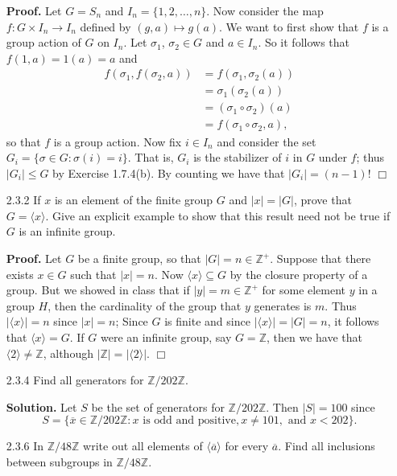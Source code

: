 \documentclass[9pt]{article}
\newcommand{\qed}{\hfill \ensuremath{\Box}}
\newcommand{\cyc}[1]{\langle #1 \rangle}
\newcommand{\Z}{\mathbb{Z}}
\begin{document}
\begin{enumerate}
      \textbf{Proof.} Let $G = S_n$ and $I_n = \{1, 2, \ldots, n\}$. Now
      consider the map $f: G \times I_n \rightarrow I_n$ defined by 
      $(g, a) \mapsto g(a)$. We want to first show that $f$ is a group action of
      $G$ on $I_n$. Let $\sigma_1$, $\sigma_2 \in G$ and $a \in I_n$. So it
      follows that $f(1, a) = 1(a) = a$ and
      \begin{align*}
         f(\sigma_1, f(\sigma_2, a)) &= f(\sigma_1, \sigma_2(a)) \\
            &= \sigma_1(\sigma_2(a)) \\
            &= (\sigma_1 \circ \sigma_2)(a) \\
            &= f(\sigma_1 \circ \sigma_2, a),
      \end{align*}
      so that $f$ is a group action. Now fix $i \in I_n$ and consider the set
      $G_i = \{\sigma \in G : \sigma(i) = i\}$. That is, $G_i$ is the stabilizer
      of $i$ in $G$ under $f$; thus $|G_i| \le G$ by Exercise 1.7.4(b). By
      counting we have that $|G_i| = (n - 1)!$ \qed
   \item[2.3.2]   If $x$ is an element of the finite group $G$ and $|x| = |G|$,
                  prove that $G = \cyc{x}$. Give an explicit example to show 
                  that this result need not be true if $G$ is an infinite group.
                  
      \textbf{Proof.} Let $G$ be a finite group, so that $|G| = n \in \Z^+$.
      Suppose that there exists $x \in G$ such that $|x| = n$. Now
      $\cyc{x} \subseteq G$ by the closure property of a group. But we showed in
      class that if $|y| = m \in \Z^+$ for some element $y$ in a group $H$, then the
      cardinality of the group that $y$ generates is $m$. Thus $|\cyc{x}| = n$
      since $|x| = n$; Since $G$ is finite and since $|\cyc{x}| = |G| = n$, it
      follows that $\cyc{x} = G$. If $G$ were an infinite group, say $G = \Z$,
      then we have that $\cyc{2} \neq \Z$, although $|\Z| = |\cyc{2}|$.      \qed
   \item[2.3.4]   Find all generators for $\Z/202\Z$.
   
      \textbf{Solution.} Let $S$ be the set of generators for $\Z/202\Z$. Then
      $|S| = 100$ since
      $$S = \{\overline{x} \in \Z/202\Z: x \text{ is odd and positive},
        x \neq 101, \text{ and } x < 202\}.$$
   \item[2.3.6]   In $\Z/48\Z$ write out all elements of $\cyc{\overline{a}}$
                  for every $\overline{a}$. Find all inclusions between
                  subgroups in $\Z/48\Z$.
      

\end{enumerate}
\end{document}
